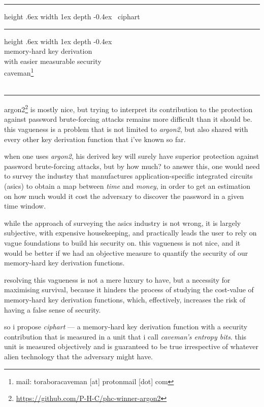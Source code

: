 \documentclass[twocolumn]{article}
\makeatletter
\def\myrulefill{%
    \leavevmode\leaders\hrule%
    height .6ex width 1ex depth -0.4ex%
    \hfill\kern\z@%
}
\makeatother
\begin{document}
\SetInd{.15em}{1em}

\begin{center}
\Huge
\myrulefill\ ciphart \myrulefill\\
\LARGE
memory-hard key derivation \\
with easier measurable security\\
\normalsize
caveman\footnote{mail: toraboracaveman [at] protonmail [dot] com}\\
\footnotesize
\DTMnow\\
\rule{1\columnwidth}{2pt}
\end{center}

argon2\footnote{\url{https://github.com/P-H-C/phc-winner-argon2}} is mostly
nice, but trying to interpret its contribution to the protection against
password brute-forcing attacks remains more difficult than it should be.
this vagueness is a problem that is not limited to \emph{argon2}, but also
shared with every other key derivation function that i've known so far.

when one uses \emph{argon2}, his derived key will surely have superior
protection against password brute-forcing attacks, but by how much?  to
answer this, one would need to survey the industry that manufactures
application-specific integrated circuits (asics) to obtain a map between
\emph{time} and \emph{money}, in order to get an estimation on how much
would it cost the adversary to discover the password in a given time
window.

while the approach of surveying the asics industry is not wrong, it is
largely subjective, with expensive housekeeping, and practically leads the
user to rely on vague foundations to build his security on.  this vagueness
is not nice, and it would be better if we had an objective measure to
quantify the security of our memory-hard key derivation functions.

resolving this vagueness is not a mere luxury to have, but a necessity for
maximising survival, because it hinders the process of studying the
cost-value of memory-hard key derivation functions, which, effectively,
increases the risk of having a false sense of security.

so i propose \emph{ciphart} --- a memory-hard key derivation function with
a security contribution that is measured in a unit that i call
\emph{caveman's entropy bits}.  this unit is measured objectively and is
guaranteed to be true irrespective of whatever alien technology that the
adversary might have.
\end{document}
